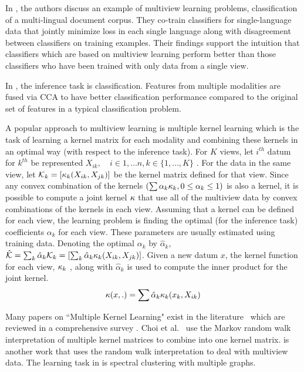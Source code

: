 \documentclass[12pt,oneside,final]{thesis}
\begin{document}
In  \cite{Amini2009}, the authors  discuss  an example of multiview learning problems, classification of a multi-lingual document corpus. They  co-train  classifiers for single-language data that jointly minimize  loss in each single language along with disagreement between classifiers on training examples. Their findings support the intuition that  classifiers which are based on multiview learning perform   better than those classifiers who have been trained with only data from a single view.

In \cite{Sun2005}, the inference task is classification. Features from multiple modalities are fused via CCA to have better classification performance compared to the original set of features in a typical classification problem.

A popular approach to multiview learning is multiple kernel learning which is the task of learning a  kernel matrix for each modality and combining these kernels in an optimal way (with respect to the inference task). For $K$ views, let $i^{th}$ datum for $k^{th}$ be represented $X_{ik},\quad i \in {1,\ldots n}, k \in \{ 1,\ldots, K \}$ . For the data in the same view, let ${\mathcal{K}}_{k} = \left[ \kappa_{k} (X_{ik},X_{jk}) \right] $ be the kernel matrix defined for that view.  Since any convex combination of the kernels $(\sum{\alpha_k \kappa_{k} } , 0 \leq \alpha_k \leq 1)$ is also a kernel, it is possible to compute a joint kernel $\kappa$ that use all of the multiview data by convex  combinations of the kernels in each view. Assuming that a kernel can be defined for each view, the learning problem is  finding the optimal (for the inference task) coefficients $\alpha_k$ for each view. These parameters are usually estimated using training data. Denoting the optimal  $\alpha_k$ by  $\hat{\alpha}_k$,  $\hat{\mathcal{K}} = \sum_k{\hat{\alpha}_k \mathcal{K}_{k} }  =  \left[ \sum_k{\hat{\alpha}_k {\kappa_k} (X_{ik},X_{jk})} \right] $.  Given a new datum $x$, the kernel function for each view, $\kappa_{k}$ ,  along with $\hat{\alpha}_k$ is used to compute the inner product for the joint kernel. 
\[
{\kappa}(x,.)= \sum{\hat{\alpha}_k {\kappa_k} (x_{k},X_{ik})} 
\]

Many papers on ``Multiple Kernel Learning"   exist in the literature~\cite{McFee:2011:LMS:1953048.1953063,Lin2009,Lanckriet2004} which are reviewed in a comprehensive survey \cite{MKLSurvey}.
Choi et al.\ \cite{Choi:2008:MIM:1619995.1620064} use the Markov random walk interpretation of multiple kernel matrices to combine into one kernel matrix. \cite{ZhouBurges2007a} is another work that uses the random walk interpretation to deal with multiview data. The learning task in  \cite{ZhouBurges2007a} is spectral clustering with multiple graphs.
\end{document}
